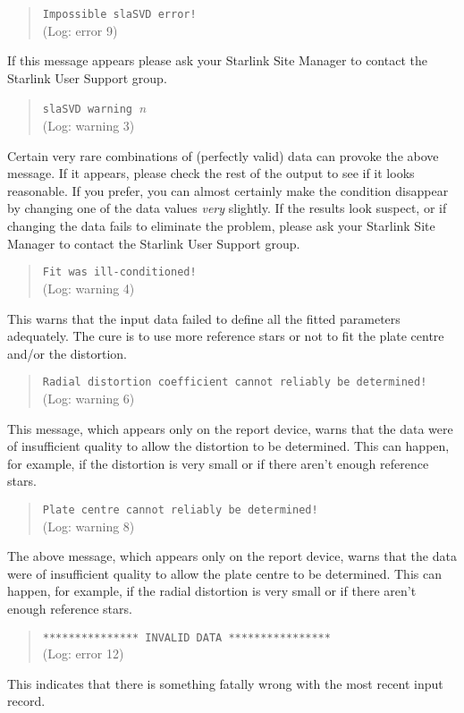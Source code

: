 \documentclass[twoside,11pt]{article}
\renewcommand{\_}{\texttt{\symbol{95}}}
\begin{document}
\goodbreak
\begin{quote}
\texttt{Impossible sla\_SVD error!}\\
(Log: error 9)
\end{quote}
If this message appears please ask your Starlink Site Manager
to contact the Starlink User Support group.

\begin{quote}
\texttt{sla\_SVD warning }\textit{n}\\
(Log: warning 3)
\end{quote}
Certain very rare combinations of (perfectly valid)
data can provoke the above message.
If it appears,
please check the rest of the output to see if it looks
reasonable.  If you
prefer, you can almost certainly make the condition disappear
by changing one of the data values \textit{very} slightly.
If the results look suspect, or if changing the
data fails to eliminate the problem, please
ask your Starlink Site Manager
to contact the Starlink User Support group.

\begin{quote}
\texttt{Fit was ill-conditioned!}\\
(Log: warning 4)
\end{quote}
This warns that the input data failed to
define all the fitted parameters adequately.  The cure is to
use more reference stars or not to fit the plate centre
and/or the distortion.

\begin{quote}
\texttt{Radial distortion coefficient cannot reliably be determined!}\\
(Log: warning 6)
\end{quote}
This message, which appears only on the report device, warns that
the data were of insufficient quality to allow the distortion
to be determined.  This can happen, for example, if the
distortion is very small or if there aren't enough reference stars.

\begin{quote}
\texttt{Plate centre cannot reliably be determined!}\\
(Log: warning 8)
\end{quote}
The above message, which appears only on the report device, warns that
the data were of insufficient quality to allow the plate
centre to be determined.  This can happen, for example, if the
radial distortion is very small or if there aren't enough reference stars.

\begin{quote}
\texttt{*************** INVALID DATA ****************}\\
(Log: error 12)
\end{quote}
This indicates that there is something fatally wrong with the
most recent input record.
\end{document}
